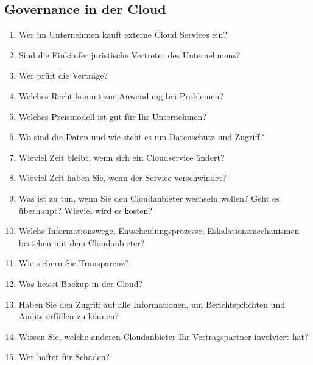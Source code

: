 \subsection{Governance in der Cloud}
\begin{enumerate}
\item Wer im Unternehmen kauft externe Cloud Services ein?
\item Sind die Einkäufer juristische Vertreter des Unternehmens?
\item Wer prüft die Verträge?
\item Welches Recht kommt zur Anwendung bei Problemen?
\item Welches Preismodell ist gut für Ihr Unternehmen?
\item Wo sind die Daten und wie steht es um Datenschutz und Zugriff?
\item Wieviel Zeit bleibt, wenn sich ein Cloudservice ändert?
\item Wieviel Zeit haben Sie, wenn der Service verschwindet?
\item Was ist zu tun, wenn Sie den Cloudanbieter wechseln wollen? Geht es überhaupt? Wieviel wird es kosten?
\item Welche Informationswege, Entscheidungsprozesse, Eskalationsmechanismen bestehen mit dem Cloudanbieter?
\item Wie sichern Sie Transparenz?
\item Was heisst Backup in der Cloud?
\item Haben Sie den Zugriff auf alle Informationen, um Berichtspflichten und Audits erfüllen zu können?
\item Wissen Sie, welche anderen Cloudanbieter Ihr Vertragspartner involviert hat?
\item Wer haftet für Schäden?
\end{enumerate}
